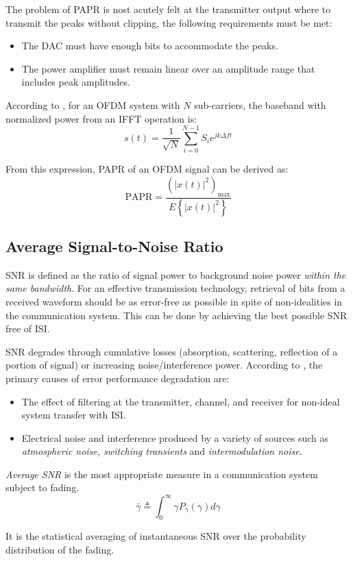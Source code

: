 The problem of \gls{PAPR} is nost acutely felt at the transmitter output where to transmit the peaks without clipping, the following requirements must be met\cite{ofdm_intro}:
\begin{itemize}
	\item The \gls{DAC} must have enough bits to accommodate the peaks.
	\item The power amplifier must remain linear over an amplitude range that includes peak amplitudes.
\end{itemize}
According to \cite{papr_paper}, for an OFDM system with \(N\) sub-carriers, the baseband with normalized power from an IFFT operation is:
\[
	s(t) = \frac{1}{\sqrt{N}} \sum_{i=0}^{N-1} S_i e^{jk\Delta ft}
\]
\begin{mathDef}
\end{mathDef}
From this expression, \gls{PAPR} of an OFDM signal can be derived as:
\[
	\text{PAPR} = \frac{\left( |x(t)|^2 \right)_\text{max}}{E\left\{ |x(t)|^2 \right\}}
\]
\begin{mathDef}
\end{mathDef}

\subsection{Average Signal-to-Noise Ratio}
\gls{SNR} is defined as the ratio of signal power to background noise power \emph{within the same bandwidth}\cite{dcommoha}.
For an effective transmission technology, retrieval of bits from a received waveform should be as error-free as possible in spite of non-idealities in the communication system. This can be done by achieving the best possible \gls{SNR} free of \gls{ISI}.

SNR degrades through cumulative losses (absorption, scattering, reflection of a portion of signal) or increasing noise/interference power. 
According to \cite{AWGN}, the primary causes of error performance degradation are:
\begin{itemize}
	\item The effect of filtering at the transmitter, channel, and receiver for non-ideal system transfer with \gls{ISI}.
\item Electrical noise and interference produced by a variety of sources such as \emph{atmospheric noise, switching transients} and \emph{intermodulation noise}.
\end{itemize}
\emph{Average \gls{SNR}} is the most appropriate measure in a communication system subject to fading.
\[
	\bar{\gamma} \triangleq \int_0^\infty \gamma P_\gamma (\gamma) d\gamma
\]
\begin{mathDef}
\end{mathDef}
It is the statistical averaging of instantaneous SNR over the probability distribution of the fading.

